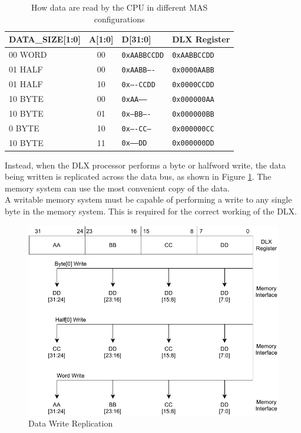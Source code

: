 \begin{table}[H]
    \centering
    \begin{tabular}{|l|c|l|l|}
    \hline
        DATA\_SIZE[1:0] & A[1:0] & D[31:0] & DLX Register \\ \hline
        00 WORD & 00 & \texttt{0xAABBCCDD} & \texttt{0xAABBCCDD} \\ \hline
        01 HALF & 00 & \texttt{0xAABB----} & \texttt{0x0000AABB} \\ \hline
        01 HALF & 10 & \texttt{0x----CCDD} & \texttt{0x0000CCDD} \\ \hline
        10 BYTE & 00 & \texttt{0xAA------} & \texttt{0x000000AA} \\ \hline
        10 BYTE & 01 & \texttt{0x--BB----} & \texttt{0x000000BB} \\ \hline
        0 BYTE & 10 & \texttt{0x----CC--} & \texttt{0x000000CC} \\ \hline
        10 BYTE & 11 & \texttt{0x------DD} & \texttt{0x000000DD} \\ \hline
    \end{tabular}
    \caption{How data are read by the CPU in different MAS configurations}
    \label{table:memory_read_configuration}
\end{table}

Instead, when the DLX processor performs a byte or halfword write, the data being written is replicated across the data bus, as shown in Figure \ref{figure:dlx:memory_replication}. The memory system can use the most convenient copy of the data.\\

A writable memory system must be capable of performing a write to any single byte in the memory system. This is required for the correct working of the DLX. 

\begin{figure}[H]
    \centering
    \includegraphics[width=1.0\textwidth]{chapters/2_dlx/images/DLX-MemoryWordReplication.pdf}
    \caption{Data Write Replication}
    \label{figure:dlx:memory_replication}
\end{figure} 

